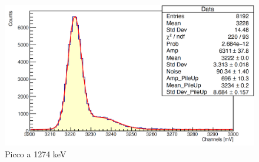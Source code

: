 \documentclass[a4paper,10pt]{article}
\begin{document}
\begin{figure}[H]
    \centering
    \includegraphics[scale=0.45]{appendice/spettri/NaCu2_54}
    \caption{Picco a 1274 keV}
\end{figure}
\end{document}
